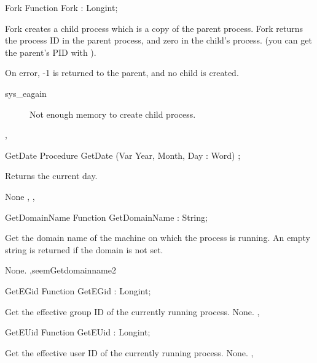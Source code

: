 \begin{function}{Fork}
\Declaration
Function Fork  : Longint;

\Description

Fork creates a child process which is a copy of the parent process.
Fork returns the process ID in the parent process, and zero in the child's
process. (you can get the parent's PID with ).

\Errors
On error, -1 is returned to the parent, and no child is created.
\begin{description}
\item [sys\_eagain] Not enough memory to create child process.
\end{description}

\SeeAlso
{}, 
\end{function}
\html{}
\begin{procedure}{GetDate}
\Declaration
Procedure GetDate  (Var Year, Month, Day : Word) ;

\Description

Returns the current day.

\Errors
None
\SeeAlso
{}, ,  
\end{procedure}
\html{}
\begin{function}{GetDomainName}
\Declaration
Function GetDomainName  : String;

\Description

Get the domain name of the machine on which the process is running.
An empty string is returned if the domain is not set.

\Errors
None.
\SeeAlso
 ,seem{Getdomainname}{2} 
\end{function}
\html{}
\begin{function}{GetEGid}
\Declaration
Function GetEGid  : Longint;

\Description
 Get the effective group ID of the currently running process.
\Errors
None.
\SeeAlso
{},  
\end{function}
\html{}
\begin{function}{GetEUid}
\Declaration
Function GetEUid  : Longint;

\Description
 Get the effective user ID of the currently running process.
\Errors
None.
\SeeAlso
{},  
\end{function}
